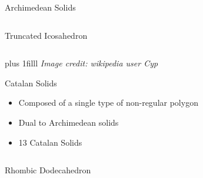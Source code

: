 \documentclass{beamer}
\newcommand{\btVFill}{\vskip0pt plus 1filll}
\begin{document}
\begin{frame}{Archimedean Solids}
\begin{columns}
\begin{column}{0.32\textwidth}
      Truncated Icosahedron
     \end{column}
\end{columns}
\btVFill
\textit{\scriptsize Image credit: wikipedia user Cyp}
\end{frame}
\begin{frame}{Catalan Solids}
\begin{itemize}
  \item Composed of a single type of non-regular polygon
  \item Dual to Archimedean solids
  \item 13 Catalan Solids
\end{itemize}
\vspace{0.1 in}
\begin{columns}
    \begin{column}{0.32\textwidth}
      \centering


      Rhombic Dodecahedron
     \end{column}
    \begin{column}{0.32\textwidth}
      \centering
      

\end{column}
\end{columns}
\end{frame}
\end{document}
